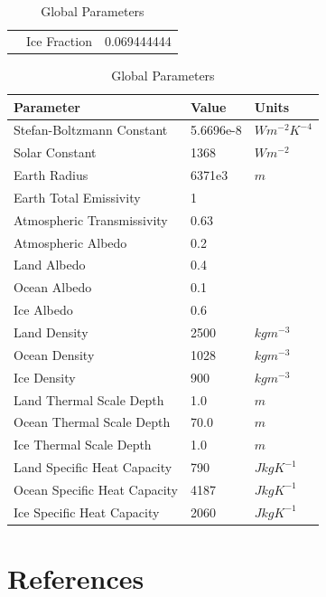 \documentclass[12pt]{article}
\begin{document}
\begin{table}[H]
{\begin{tabular}{lll}
     & Ice Fraction & 0.069444444\\
    \end{tabular}
    \label{tab:zoneparams}
    }
    \hfill
    \parbox{.45\linewidth}{
    \captionsetup{singlelinecheck = false, justification=justified}
    \caption{Global Parameters}
    \begin{tabular}{lll}
    \hline
    Parameter & Value & Units \\
    \hline
    Stefan-Boltzmann Constant & 5.6696e-8 & $Wm^{-2}K^{-4}$ \\
    Solar Constant & 1368 & $Wm^{-2}$ \\
    Earth Radius & 6371e3 & $m$ \\
    Earth Total Emissivity & 1  \\
    Atmospheric Transmissivity & 0.63  \\
    Atmospheric Albedo & 0.2 \\
    Land Albedo & 0.4 \\
    Ocean Albedo & 0.1\\
    Ice Albedo & 0.6 \\
    Land Density & 2500 & $kgm^{-3}$\\
    Ocean Density & 1028 & $kgm^{-3}$\\
    Ice Density & 900 & $kgm^{-3}$\\
    Land Thermal Scale Depth & 1.0 & $m$ \\
    Ocean Thermal Scale Depth & 70.0 & $m$ \\
    Ice Thermal Scale Depth & 1.0 & $m$ \\
    Land Specific Heat Capacity & 790 & $JkgK^{-1}$\\
    Ocean Specific Heat Capacity & 4187 & $JkgK^{-1}$\\
    Ice Specific Heat Capacity & 2060 & $JkgK^{-1}$\\
    \end{tabular}
    \label{tab:globalparams}}
\end{table}
\FloatBarrier

\newpage
\section{References}
\printbibliography
\end{document}
